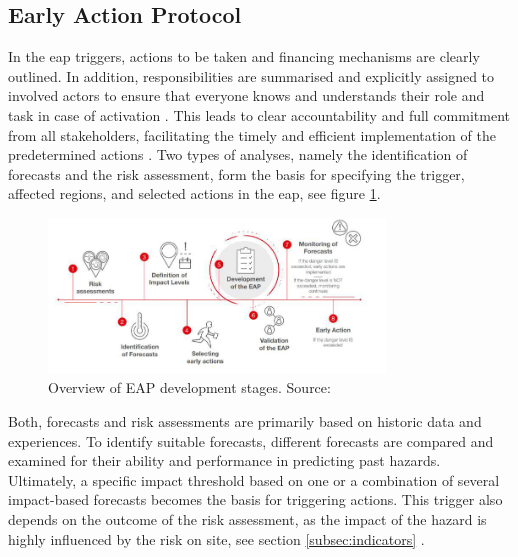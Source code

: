 \subsection{Early Action Protocol}\label{subsec:eap}

In the \acrfull{eap} triggers, actions to be taken and financing mechanisms are clearly outlined. In addition, responsibilities are summarised and explicitly assigned to involved actors to ensure that everyone knows and understands their role and task in case of activation \autocite{ruthForecastbasedFinancingPolicy2017}. This leads to clear accountability and full commitment from all stakeholders, facilitating the timely and efficient implementation of the predetermined actions \autocite{ruthForecastbasedFinancingPolicy2017}.\newline
Two types of analyses, namely the identification of forecasts and the risk assessment, form the basis for specifying the trigger, affected regions, and selected actions in the \acrshort{eap}, see figure \ref{fig:th_eap_dev}. 

\begin{figure}[!htp]
    \centering
    \includegraphics[width=0.8\textwidth]{figures/2023_MA_th_eap_validation_steps.jpg}
    \decoRule
    \caption[Overview of EAP development stages]{Overview of EAP development stages. Source: \textcite{grc2ndAfricanDialogue2019}}
    \label{fig:th_eap_dev}
\end{figure}

Both, forecasts and risk assessments are primarily based on historic data and experiences. To identify suitable forecasts, different forecasts are compared and examined for their ability and performance in predicting past hazards. Ultimately, a specific impact threshold based on one or a combination of several impact-based forecasts becomes the basis for triggering actions. This trigger also depends on the outcome of the risk assessment, as the impact of the hazard is highly influenced by the risk on site, see section \ref{subsec:indicators} \autocite{ifrcFbFPractitionersManual2023,ifrcForecastbasedFinancingNew2019}.

